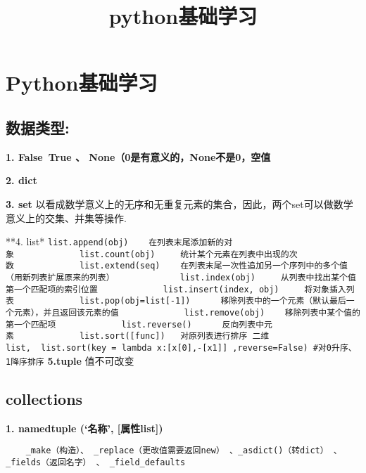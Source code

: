 \documentclass[11pt]{article}
\title{python基础学习}
\begin{document}
    
    \maketitle
    
    

    
    \hypertarget{pythonux57faux7840ux5b66ux4e60}{%
\section{Python基础学习}\label{pythonux57faux7840ux5b66ux4e60}}

    \hypertarget{ux6570ux636eux7c7bux578b}{%
\subsection{数据类型:}\label{ux6570ux636eux7c7bux578b}}

\textbf{1. False~True 、 None（0是有意义的，None不是0，空值}

\textbf{2. dict}

\textbf{3. set}
以看成数学意义上的无序和无重复元素的集合，因此，两个set可以做数学意义上的交集、并集等操作.

**4. list*
\texttt{list.append(obj)\ \ \ \ 在列表末尾添加新的对象\ \ \ \ \ \ \ \ \ \ \ \ \ list.count(obj)\ \ \ \ \ 统计某个元素在列表中出现的次数\ \ \ \ \ \ \ \ \ \ \ \ \ list.extend(seq)\ \ \ \ 在列表末尾一次性追加另一个序列中的多个值（用新列表扩展原来的列表）\ \ \ \ \ \ \ \ \ \ \ \ \ list.index(obj)\ \ \ \ \ 从列表中找出某个值第一个匹配项的索引位置\ \ \ \ \ \ \ \ \ \ \ \ \ list.insert(index,\ obj)\ \ \ \ \ 将对象插入列表\ \ \ \ \ \ \ \ \ \ \ \ \ list.pop(obj=list{[}-1{]})\ \ \ \ \ \ 移除列表中的一个元素（默认最后一个元素），并且返回该元素的值\ \ \ \ \ \ \ \ \ \ \ \ \ list.remove(obj)\ \ \ \ 移除列表中某个值的第一个匹配项\ \ \ \ \ \ \ \ \ \ \ \ \ list.reverse()\ \ \ \ \ \ 反向列表中元素\ \ \ \ \ \ \ \ \ \ \ \ \ list.sort({[}func{]})\ \ \ 对原列表进行排序\ 二维list,\ \ list.sort(key\ =\ lambda\ x:{[}x{[}0{]},-{[}x1{]}{]}\ ,reverse=False)\ \#对0升序、1降序排序}
\textbf{5.tuple} 值不可改变

    \hypertarget{collections}{%
\subsection{collections}\label{collections}}

\textbf{1. namedtuple (`名称', {[}属性list{]})}

\begin{verbatim}
    _make（构造）、 _replace（更改值需要返回new） 、_asdict()（转dict） 、_fields（返回名字） 、 _field_defaults
\end{verbatim}
\end{document}
